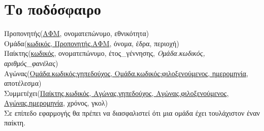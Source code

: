 \documentclass{article}
\begin{document}
\section{Το ποδόσφαιρο}

Προπονητής(\underline{ΑΦΜ}, ονοματεπώνυμο, εθνικότητα) \\
Ομάδα(\underline{κωδικός, Προπονητής.ΑΦΜ}, όνομα, έδρα, περιοχή) \\
Παίκτης(\underline{κωδικός}, ονοματεπώνυμο, έτος\_γέννησης, \textit{Ομάδα.κωδικός, αριθμός\_φανέλας}) \\
Αγώνας(\underline{Ομάδα.κωδικός:γηπεδούχος, Ομάδα.κωδικός:φιλοξενούμενος, ημερομηνία}, αποτέλεσμα) \\
Συμμετέχει(\underline{Παίκτης.κωδικός, Αγώνας.γηπεδούχος, Αγώνας.φιλοξενούμενος, Αγώνας.ημερομηνία}, χρόνος, γκολ) \\

Σε επίπεδο εφαρμογής θα πρέπει να διασφαλιστεί ότι μια ομάδα έχει τουλάχιστον έναν παίκτη.
\end{document}

